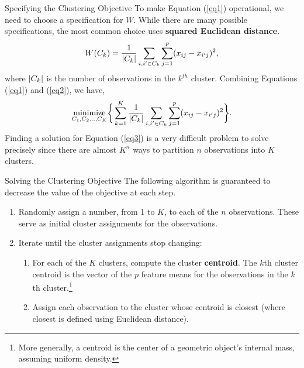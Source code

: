 \documentclass[pdf]{beamer}
\newcommand{\empr}[1]{{\color{franklinblue}\textbf{#1}}}
\theoremstyle{remark}
\theoremstyle{definition}
\begin{document}
\begin{frame}[t]{Specifying the Clustering Objective}
To make Equation (\ref{eq1}) operational, we need to choose a specification for $W$.  While there are many possible specifications, the most common choice uses \empr{squared Euclidean distance}.  \\
\vspace{-0.5ex}
\begin{equation}\label{eq2}
W(C_k) = \frac{1}{\abs{C_k}} \sum_{i,i' \in C_k} \sum_{j=1}^{p}(x_{ij} - x_{i'j})^2,
\end{equation}
where $\abs{C_k}$ is the number of observations in the $k^{th}$ cluster.  Combining Equations (\ref{eq1}) and (\ref{eq2}), we have, \\
\vspace{-0.5ex}
\begin{equation}\label{eq3}
\underset{C_1, C_2 \ldots, C_K}{\text{minimize}} \bigg\{ \sum_{k=1}^{K} \frac{1}{\abs{C_k}} \sum_{i,i' \in C_k} \sum_{j=1}^{p}(x_{ij} - x_{i'j})^2 \bigg\}.
\end{equation}
Finding a solution for Equation (\ref{eq3}) is a very difficult problem to solve
precisely since there are almost $K^n$ ways to partition $n$ observations into $K$
clusters.%
\end{frame}

\begin{frame}[t]{Solving the Clustering Objective}
The following algorithm is guaranteed to decrease the value of the objective
at each step. \\
\vspace{1.5ex}
\begin{enumerate}
\item Randomly assign a number, from 1 to $K$, to each of the $n$ observations. These serve as initial cluster assignments for the observations.
\item Iterate until the cluster assignments stop changing:
\begin{enumerate} 
  \item For each of the $K$ clusters, compute the cluster \empr{centroid}. The $k$th cluster centroid is the vector of the $p$ feature means for the observations in the $k$th cluster.\footnote{More generally, a centroid is the center of a geometric object's internal mass, assuming uniform density.}
  \item  Assign each observation to the cluster whose centroid is closest (where closest is defined using Euclidean distance).
\end{enumerate}
\end{enumerate} 
\end{frame}
\end{document}
